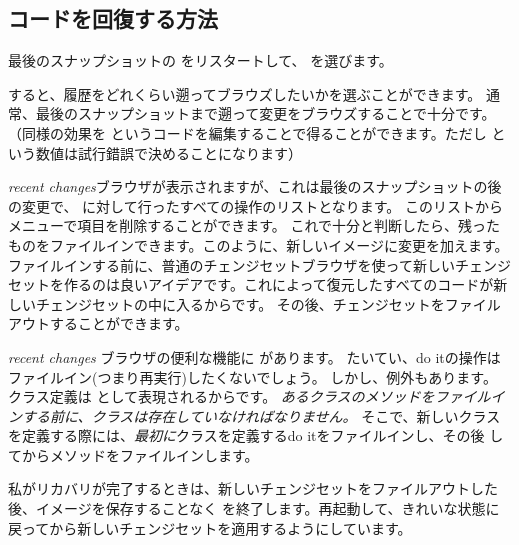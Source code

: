 \documentclass[a4paper,10pt,twoside]{book}
\begin{document}
\subsection{コードを回復する方法}
最後のスナップショットの \pharo をリスタートして、  を選びます。




すると、履歴をどれくらい遡ってブラウズしたいかを選ぶことができます。
通常、最後のスナップショットまで遡って変更をブラウズすることで十分です。（同様の効果を  というコードを編集することで得ることができます。ただし  という数値は試行錯誤で決めることになります）

\emph{recent changes}ブラウザが表示されますが、これは最後のスナップショットの後の変更で、 \pharo に対して行ったすべての操作のリストとなります。
このリストから \actclick メニューで項目を削除することができます。
これで十分と判断したら、残ったものをファイルインできます。このように、新しいイメージに変更を加えます。
ファイルインする前に、普通のチェンジセットブラウザを使って新しいチェンジセットを作るのは良いアイデアです。これによって復元したすべてのコードが新しいチェンジセットの中に入るからです。
その後、チェンジセットをファイルアウトすることができます。

\emph{recent changes} ブラウザの便利な機能に  があります。
たいてい、do itの操作はファイルイン(つまり再実行)したくないでしょう。
しかし、例外もあります。
クラス定義は  として表現されるからです。
\emph{あるクラスのメソッドをファイルインする前に、クラスは存在していなければなりません。}
そこで、新しいクラスを定義する際には、\emph{最初に}クラスを定義するdo itをファイルインし、その後  してからメソッドをファイルインします。

私がリカバリが完了するときは、新しいチェンジセットをファイルアウトした後、イメージを保存することなく \pharo を終了します。再起動して、きれいな状態に戻ってから新しいチェンジセットを適用するようにしています。
\end{document}
